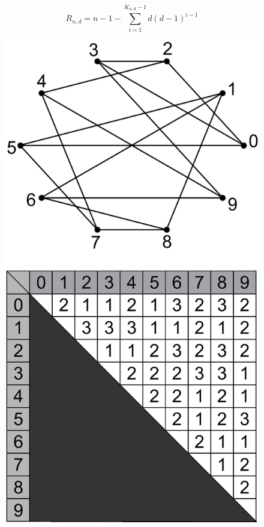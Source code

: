 \documentclass[graybox]{svmult}
\begin{document}
\begin{equation*}
R_{n,d} = n - 1 - 
\sum_{i=1}^{K_{n,d}-1}  d(d-1)^{i-1} 
\end{equation*}

\begin{figure}[t]
 \begin{minipage}{0.5\hsize}
  \begin{center}
\includegraphics[scale=0.25,clip]{img/n10d3-random.eps}

\end{center}
\end{minipage}
\end{figure}
\end{document}
